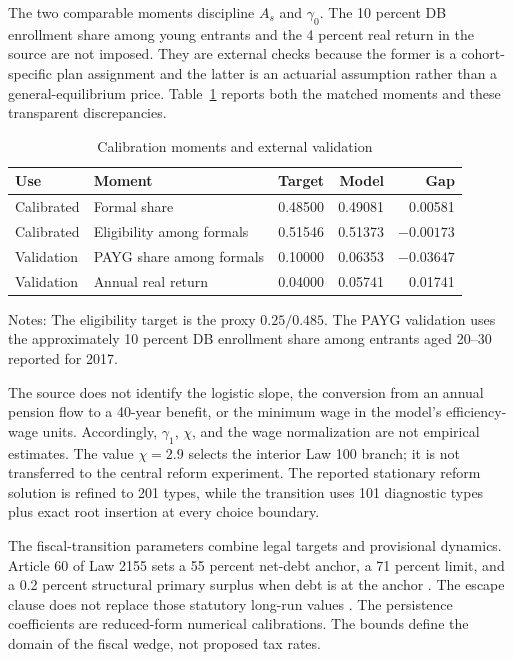 \documentclass[12pt]{article}
\newcommand{\1}{\mathbf{1}}
\begin{document}
The two comparable moments discipline $A_s$ and $\gamma_0$. The 10 percent DB enrollment
share among young entrants and the 4 percent real return in the source are not imposed. They
are external checks because the former is a cohort-specific plan assignment and the latter is
an actuarial assumption rather than a general-equilibrium price. Table~\ref{tab:moments}
reports both the matched moments and these transparent discrepancies.

\begin{table}[htbp]\centering
\small
\caption{Calibration moments and external validation}\label{tab:moments}
\begin{tabular}{llrrr}
\toprule Use&Moment&Target&Model&Gap\\ \midrule
Calibrated&Formal share&0.48500&0.49081&0.00581\\
Calibrated&Eligibility among formals&0.51546&0.51373&$-0.00173$\\
Validation&PAYG share among formals&0.10000&0.06353&$-0.03647$\\
Validation&Annual real return&0.04000&0.05741&0.01741\\ \bottomrule
\end{tabular}
\begin{flushleft}\footnotesize
Notes: The eligibility target is the proxy $0.25/0.485$. The PAYG validation uses the
approximately 10 percent DB enrollment share among entrants aged 20--30 reported for 2017.
\end{flushleft}
\end{table}

The source does not identify the logistic slope, the conversion from an annual pension flow
to a 40-year benefit, or the minimum wage in the model's efficiency-wage units. Accordingly,
$\gamma_1$, $\chi$, and the wage normalization are not empirical estimates. The value
$\chi=2.9$ selects the interior Law 100 branch; it is not transferred to the central reform
experiment. The reported stationary reform solution is refined to 201 types, while the
transition uses 101 diagnostic types plus exact root insertion at every choice boundary.

The fiscal-transition parameters combine legal targets and provisional dynamics. Article 60
of Law 2155 sets a 55 percent net-debt anchor, a 71 percent limit, and a 0.2 percent structural
primary surplus when debt is at the anchor \citep{Colombia2021FiscalRule}. The escape clause
does not replace those statutory long-run values \citep{MFMP2026}. The persistence
coefficients are reduced-form numerical calibrations. The bounds define the domain of the
fiscal wedge, not proposed tax rates.
\end{document}
